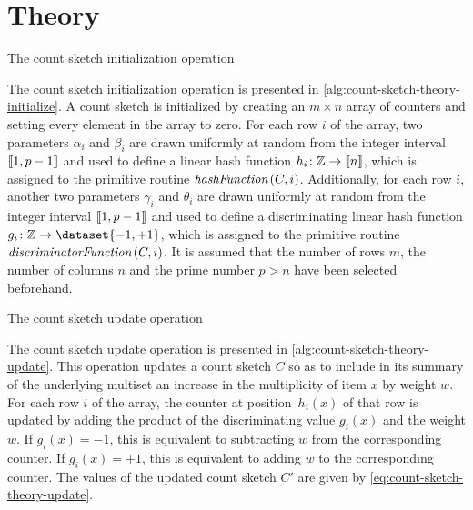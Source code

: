 \section{Theory}
\label{sec:count-sketch-theory}

\begin{algorithm}
  \caption{The count sketch initialization operation}
  \label{alg:count-sketch-theory-initialize}
  
\end{algorithm}

The count sketch initialization operation is presented in \cref{alg:count-sketch-theory-initialize}.
A count sketch is initialized by creating an \( m \times n \) array of counters and setting every element in the array to zero.
For each row \( i \) of the array, two parameters \( \alpha_{i} \) and \( \beta_{i} \) are drawn uniformly at random from the integer interval \( \llbracket1, p - 1\rrbracket \) and used to define a linear hash function \( h_{i} \colon \mathbb{Z} \to \llbracket n\rrbracket \), which is assigned to the primitive routine \( \hashFunction (C, i) \).
Additionally, for each row \( i \), another two parameters \( \gamma_{i} \) and \( \theta_{i} \) are drawn uniformly at random from the integer interval \( \llbracket1, p - 1\rrbracket \) and used to define a discriminating linear hash function \( g_{i} \colon \integers \to \dataset{-1, +1} \), which is assigned to the primitive routine \( \discriminatorFunction (C, i) \).
It is assumed that the number of rows \( m \), the number of columns \( n \) and the prime number \( p > n \) have been selected beforehand.

\begin{algorithm}
  \caption{The count sketch update operation}
  \label{alg:count-sketch-theory-update}
  
\end{algorithm}

The count sketch update operation is presented in \cref{alg:count-sketch-theory-update}.
This operation updates a count sketch \( C \) so as to include in its summary of the underlying multiset an increase in the multiplicity of item \( x \) by weight \( w \).
For each row \( i \) of the array, the counter at position~\( h_{i} (x) \) of that row is updated by adding the product of the discriminating value \( g_{i} (x) \) and the weight \( w \).
If \( g_{i} (x) = -1 \), this is equivalent to subtracting \( w \) from the corresponding counter.
If \( g_{i} (x) = +1 \), this is equivalent to adding \( w \) to the corresponding counter.
The values of the updated count sketch \( C' \) are given by \cref{eq:count-sketch-theory-update}.

